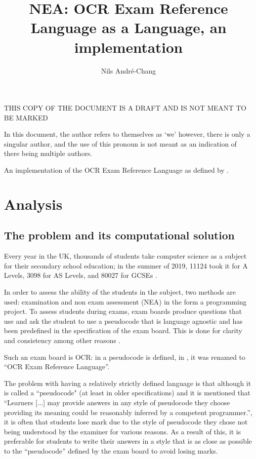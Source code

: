 \documentclass{article}
\author{Nils André-Chang}
\title{NEA: OCR Exam Reference Language as a Language, an implementation}
\begin{document}
{\huge THIS COPY OF THE DOCUMENT IS A DRAFT AND IS NOT MEANT TO BE MARKED}

\maketitle

\tableofcontents

In this document, the author refers to themselves as `we' however, there is
only a singular author, and the use of this pronoun is not meant as an
indication of there being multiple authors.

An implementation of the OCR Exam Reference Language as defined by
\textcite{j277, h446}.

\section{Analysis}

\subsection{The problem and its computational solution}

Every year in the UK, thousands of students take computer science as a subject
for their secondary school education; in the summer of 2019, 11124 took it for
A Levels, 3098 for AS Levels, and 80027 for GCSEs
\cite{jcqalevel19, jcqgcse19}.

In order to assess the ability of the students in the subject, two methods are
used: examination and non exam assessment (NEA) in the form a programming
project. To assess students during exams, exam boards produce questions that
use and ask the student to use a pseudocode that is language agnostic and has
been predefined in the specification of the exam board. This is done for
clarity and consistency among other reasons \cite{h446, j276, j277}.

Such an exam board is OCR: in \textcite{h446, j276, j277} a pseudocode is
defined, in \textcite{j277}, it was renamed to ``OCR Exam Reference Language''.

The problem with having a relatively strictly defined language is that although
it is called a ``pseudocode" (at least in older specifications) and it is
mentioned that ``Learners [...] may provide answers in any style of pseudocode
they choose providing its meaning could be reasonably inferred by a competent
programmer.'', it is often that students lose mark due to the style of
pseudocode they chose not being understood by the examiner for various reasons.
As a result of this, it is preferable for students to write their answers in a
style that is as close as possible to the ``pseudocode'' defined by the exam
board to avoid losing marks.
\end{document}
